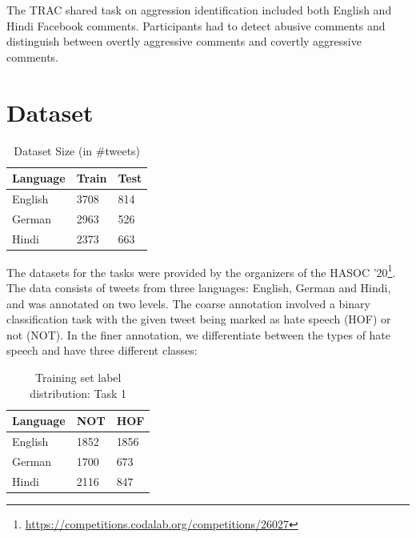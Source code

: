 \documentclass[
]{ceurart}
\begin{document}
The TRAC shared task\cite{ws-2018-trolling} on aggression identification included both English and Hindi Facebook comments. Participants had to detect abusive comments and distinguish between overtly aggressive comments and covertly aggressive comments.

\section{Dataset}

\begin{table}[]
\begin{tabular}{lll}
\toprule
\textbf{Language} & \textbf{Train} & \textbf{Test} \\
\midrule
English  & 3708  & 814  \\
German   & 2963  & 526 \\
Hindi    & 2373  & 663 
\end{tabular}
\caption{Dataset Size (in \#tweets)}
\label{tab:datastats}
\end{table}

The datasets for the tasks were provided by the organizers of the HASOC '20\footnote{\url{https://competitions.codalab.org/competitions/26027}}. The data consists of tweets from three languages: English, German and Hindi, and was annotated on two levels. The coarse annotation involved a binary classification task with the given tweet being marked as hate speech (HOF) or not (NOT). In the finer annotation, we differentiate between the types of hate speech and have three different classes:

\begin{table}[]
\begin{tabular}{lll}
\toprule
\textbf{Language} &\textbf{NOT} & \textbf{HOF} \\
\midrule
English  & 1852 & 1856 \\
German   & 1700 & 673 \\
Hindi    & 2116 & 847 
\end{tabular}
\caption{Training set label distribution: Task 1}
\label{tab:datacoarse}
\end{table}
\end{document}
